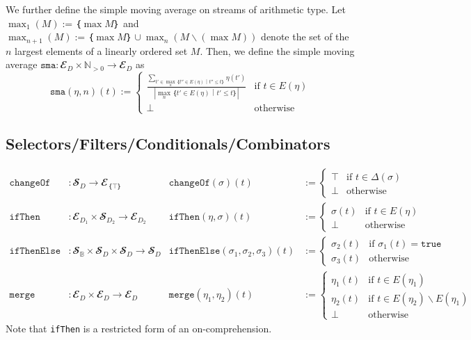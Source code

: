 We further define the simple moving average on streams of arithmetic type.
Let $\max_1(M) := ｛\max M｝$ and $\max_{n+1}(M) := ｛\max M｝ ∪ \max_n (M∖(\max M))$ denote the set of the $n$ largest elements of a linearly ordered set $M$.  
Then, we define the simple moving average $\mathtt{sma}: 𝓔_D × ℕ_{>0} → 𝓔_D$ as
\[
   \mathtt{sma}(η,n)(t) := \begin{cases}    
      \frac{∑_{t'∈ \max_n ｛t''∈E(η)｜t''≤t  ｝} η(t')}{|\max_n ｛t'∈E(η)｜t'≤t ｝|} & \text{if } t∈E(η)\\
      ⊥ & \text{otherwise}
    \end{cases}
\]



\subsection{Selectors/Filters/Conditionals/Combinators}

\begin{align*}
  \mathtt{changeOf}&: 𝓢_{D} → 𝓔_{｛⊤｝}
      & \mathtt{changeOf}(σ)(t) &:= \begin{cases}
           ⊤ & \text{if } t∈Δ(σ)\\
           ⊥ & \text{otherwise}
         \end{cases}\\
  \mathtt{ifThen}&: 𝓔_{D_1} × 𝓢_{D_2} → 𝓔_{D_2}
      & \mathtt{ifThen}(η,σ)(t) &:= \begin{cases}
           σ(t) & \text{if } t∈E(η)\\
           ⊥ & \text{otherwise}
         \end{cases}\\
  \mathtt{ifThenElse}&: 𝓢_𝔹 × 𝓢_D × 𝓢_D → 𝓢_D
      & \mathtt{ifThenElse}(σ_1,σ_2,σ_3)(t) &:= \begin{cases}
           σ_2(t) & \text{if } σ_1(t) = \texttt{true}\\
           σ_3(t) & \text{otherwise}
         \end{cases}\\
  \mathtt{merge}&: 𝓔_D × 𝓔_D → 𝓔_D
      & \mathtt{merge}(η_1,η_2)(t) &:= \begin{cases}
           η_1(t) & \text{if } t∈E(η_1)\\
           η_2(t) & \text{if } t∈E(η_2)∖E(η_1)\\
           ⊥ & \text{otherwise}
         \end{cases}
\end{align*}
Note that \texttt{ifThen} is a restricted form of an on-comprehension.

